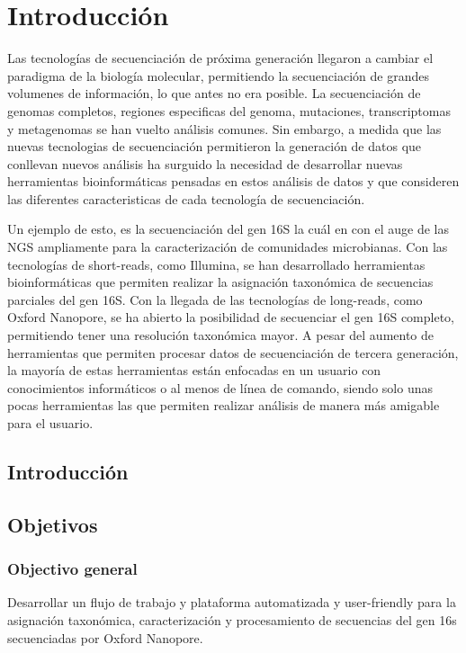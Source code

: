 \chapter{Introducción}
Las tecnologías de secuenciación de próxima generación llegaron a cambiar el paradigma de la biología molecular, permitiendo la secuenciación de grandes volumenes de información, lo que antes no era posible.
La secuenciación de genomas completos, regiones especificas del genoma, mutaciones, transcriptomas y metagenomas se han vuelto análisis comunes. Sin embargo, a medida que las nuevas tecnologias de secuenciación permitieron la generación de datos que conllevan nuevos análisis ha surguido la necesidad de desarrollar nuevas herramientas bioinformáticas pensadas en estos análisis de datos y que consideren las diferentes caracteristicas de cada tecnología de secuenciación.

Un ejemplo de esto, es la secuenciación del gen 16S la cuál en con el auge de las NGS ampliamente para la caracterización de comunidades microbianas. Con las tecnologías de short-reads, como Illumina, se han desarrollado herramientas bioinformáticas que permiten realizar la asignación taxonómica de secuencias parciales del gen 16S. Con la llegada de las tecnologías de long-reads, como Oxford Nanopore, se ha abierto la posibilidad de secuenciar el gen 16S completo, permitiendo tener una resolución taxonómica mayor. A pesar del aumento de herramientas que permiten procesar datos de secuenciación de tercera generación, la mayoría de estas herramientas están enfocadas en un usuario con conocimientos informáticos o al menos de línea de comando, siendo solo unas pocas herramientas las que permiten realizar análisis de manera más amigable para el usuario.  
\section{Introducción}
\section{Objetivos}
\subsection{Objectivo general}
Desarrollar un flujo de trabajo y plataforma automatizada y user-friendly para la asignación taxonómica, caracterización y procesamiento de secuencias del gen 16s secuenciadas por Oxford Nanopore.
